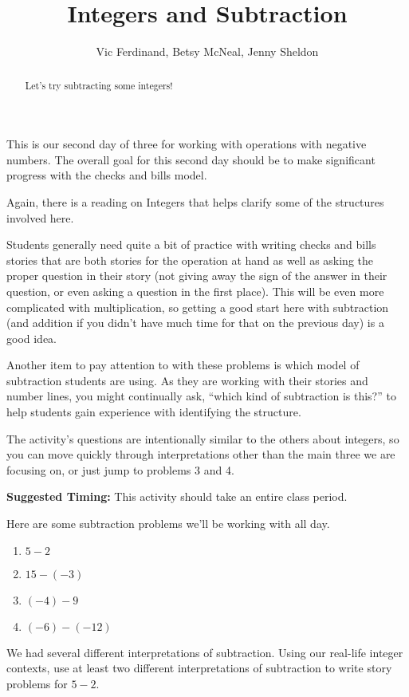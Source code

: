 \documentclass{ximera}
\title{Integers and Subtraction}
\author{Vic Ferdinand, Betsy McNeal, Jenny Sheldon}
\begin{document}
\begin{abstract}
    Let's try subtracting some integers!
\end{abstract}
\maketitle

\begin{instructorIntro}
This is our second day of three for working with operations with negative numbers.  The overall goal for this second day should be to make significant progress with the checks and bills model.

Again, there is a reading on Integers that helps clarify some of the structures involved here.

Students generally need quite a bit of practice with writing checks and bills stories that are both stories for the operation at hand as well as asking the proper question in their story (not giving away the sign of the answer in their question, or even asking a question in the first place).  This will be even more complicated with multiplication, so getting a good start here with subtraction (and addition if you didn't have much time for that on the previous day) is a good idea.

Another item to pay attention to with these problems is which model of subtraction students are using.  As they are working with their stories and number lines, you might continually ask, ``which kind of subtraction is this?'' to help students gain experience with identifying the structure.

The activity's questions are intentionally similar to the others about integers, so you can move quickly through interpretations other than the main three we are focusing on, or just jump to problems 3 and 4.

{\bf Suggested Timing:} This activity should take an entire class period.
\end{instructorIntro}

Here are some subtraction problems we'll be working with all day.

\begin{enumerate}
    \item $5 - 2$
    \item $15 - (-3)$
    \item $(-4) - 9$
    \item $(-6) - (-12)$
\end{enumerate}

\begin{question}
We had several different interpretations of subtraction.  Using our real-life integer contexts, use at least two different interpretations of subtraction to write story problems for $5 - 2$.

\end{question}
\end{document}
